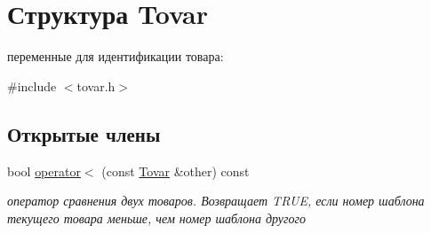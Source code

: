 \hypertarget{struct_tovar}{\section{Структура \-Tovar}
\label{struct_tovar}
}


переменные для идентификации товара\-:  




{\ttfamily \#include $<$tovar.\-h$>$}

\subsection*{Открытые члены}
\begin{DoxyCompactItemize}
\item 
\hypertarget{struct_tovar_ad566921c830e3919dda043641fc85f5e}{bool \hyperlink{struct_tovar_ad566921c830e3919dda043641fc85f5e}{operator$<$} (const \hyperlink{struct_tovar}{\-Tovar} \&other) const }\label{struct_tovar_ad566921c830e3919dda043641fc85f5e}

\begin{DoxyCompactList}\small\item\em оператор сравнения двух товаров. Возвращает \-T\-R\-U\-E, если номер шаблона текущего товара меньше, чем номер шаблона другого \end{DoxyCompactList}\end{DoxyCompactItemize}
